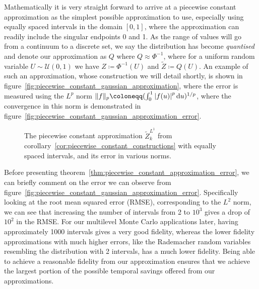 \documentclass[manuscript,review]{acmart}
\begin{document}
Mathematically it is very straight forward to arrive at a piecewise constant approximation as the simplest possible approximation to use, especially using equally spaced intervals in the domain $ [0, 1] $, where the approximation can readily include the singular endpoints 0 and 1. As the range of values will go from a continuum to a discrete set, we say the distribution has become \emph{quantised} and denote our approximation as $ Q $ where $ Q \approx \Phi^{-1} $, where for a uniform random variable $ U \sim \mathcal{U}(0, 1)$ we have $ Z \coloneqq \Phi^{-1}(U) $ and $ \tilde{Z} \coloneqq Q(U) $. An example of such an approximation, whose construction we will detail shortly, is shown in figure~\ref{fig:piecewise_constant_gaussian_approximation}, where the error is measured using the $ L^p $ norm $ \lVert f \rVert_p \coloneqq (\int_0^1 \abs{f(u)}^p \dd{u})^{1/p} $, where the convergence in this norm is demonstrated in figure~\ref{fig:piecewise_constant_gaussian_approximation_error}.

\begin{figure}[htb]
\centering

\hfill
{} \hfill 
{}\hfill

\caption{The piecewise constant approximation $ \tilde{Z}_k^{L^1} $ from corollary~\ref{cor:piecewise_constant_constructions} with equally spaced intervals, and its error in various norms.}
\label{fig:piecewise_constant_approximation}
\end{figure}

Before presenting theorem~\ref{thm:piecewise_constant_approximation_error}, we can briefly comment on the error we can observe from figure~\ref{fig:piecewise_constant_gaussian_approximation_error}. Specifically looking at the root mean squared error (RMSE), corresponding to the $ L^2 $ norm, we can see that increasing the number of intervals from 2 to $ 10^3 $ gives a drop of $ 10^2 $ in the RMSE. For our multilevel Monte Carlo applications later, having approximately 1000 intervals gives a very good fidelity, whereas the lower fidelity approximations with much higher errors, like the Rademacher random variables resembling the distribution with 2 intervals, has a much lower fidelity. Being able to achieve a reasonable fidelity from our approximation ensures that we achieve the largest portion of the possible temporal savings offered from our approximations. 
\end{document}
